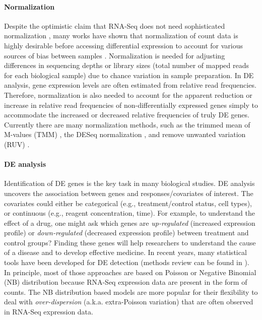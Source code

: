 \paragraph*{Normalization}
Despite the optimistic claim that RNA-Seq does not need sophisticated normalization
\citep{wang2009rna}, many works have shown that normalization of count data is highly desirable
before accessing differential expression to account for various sources of bias between samples
\citep{anders2010differential, dillies2013comprehensive,hansen2012removing, risso2014nat,
	risso2011gc,robinson2010scaling}. Normalization is needed for adjusting differences in sequencing
depths or library sizes (total number of mapped reads for each biological sample) due to chance
variation in sample preparation. In DE analysis, gene expression levels are often estimated from
relative read frequencies. Therefore, normalization is also needed to account for the apparent
reduction or increase in relative read frequencies of non-differentially expressed genes simply to
accommodate the increased or decreased relative frequencies of truly DE genes. Currently there are
many normalization methods, such as the trimmed mean of M-values (TMM) \citep{robinson2010scaling},
the DESeq normalization \citep{anders2010differential}, and remove unwanted variation (RUV)
\citep{risso2014nat}. 

\paragraph*{DE analysis}
Identification of DE genes is the key task in many biological studies. DE analysis uncovers the
association between genes and responses/covariates of interest. The covariates could either be
categorical (e.g., treatment/control status, cell types), or continuous (e.g., reagent
concentration, time). For example, to understand the effect of a drug, one might ask which genes are
\textit{up-regulated} (increased expression profile) or \textit{down-regulated} (decreased expression profile)
between treatment and control groups? Finding these genes will help researchers to understand the
cause of a disease and to develop effective medicine. In recent years, many statistical tools have been
developed for DE detection (methods review can be found in \cite{rapaport2013comprehensive,seyednasrollah2015comparison,
	soneson2013comparison}). 
In principle, most of those approaches are based on Poisson \citep{marioni2008rna, wang2010degseq}
or Negative Binomial (NB) distribution
\citep{anders2010differential,di2011nbp,oberg2012technical,robinson2007moderated, wu2013new} because
RNA-Seq expression data are present in the form of counts. %
The NB distribution based models are more popular for their flexibility to deal with 
\textit{over-dispersion} (a.k.a. extra-Poisson variation) that are often observed in RNA-Seq expression data.


